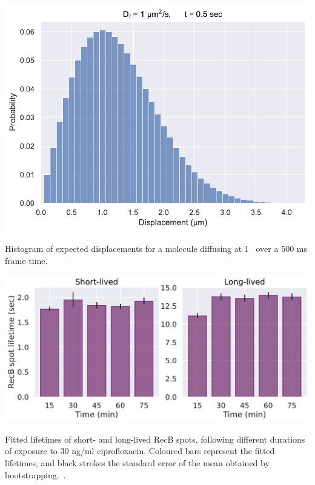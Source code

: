\begin{suppfigure*}[htbp]
    \begin{center}
        \includegraphics[width=.8\textwidth]{SI_Figures/Displacements_distribution.pdf}
    \end{center}
    \caption{Histogram of expected displacements for a molecule diffusing at 1 \ums\ over a 500 ms frame time.}\label{SIFig:displacement_simul}
\end{suppfigure*}

\begin{suppfigure*}[htbp]
    \begin{center}
        \includegraphics[width=.7\linewidth]{SI_Figures/RecB_lifetime_timepoints.pdf}
    \end{center}
    \caption{Fitted lifetimes of short- and long-lived RecB spots, following different durations of exposure to 30 ng/ml ciprofloxacin. Coloured bars represent the fitted lifetimes, and black strokes the standard error of the mean obtained by bootstrapping.\ .\ }\label{SIFig:RecB_lifetimes_timepoints}
    \end{suppfigure*}

